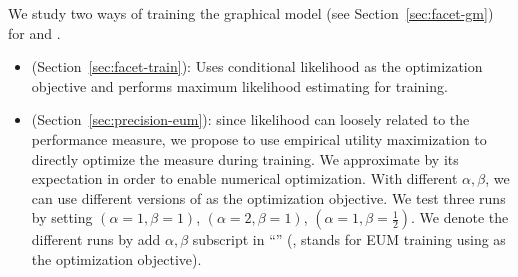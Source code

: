 
We study two ways of training the graphical model (see Section~\ref{sec:facet-gm}) for \QFI and \QFJ.
\begin{itemize}
\item \MLE (Section~\ref{sec:facet-train}): Uses conditional likelihood as the optimization objective and performs maximum likelihood estimating for training.
\item \EUM (Section~\ref{sec:precision-eum}): since likelihood can loosely related to the performance measure, we propose to use empirical utility maximization to directly optimize the \PRF measure during training. We approximate \PRF by its expectation in order to enable numerical optimization. With different $\alpha,\beta$, we can use different versions of \PRF as the optimization objective. We test three runs by setting $(\alpha\!=\!1,\beta\!=\!1)$, $(\alpha\!=\!2,\beta\!=\!1)$, $(\alpha\!=\!1,\beta\!=\!\frac{1}{2})$. 
We denote the different runs by add $\alpha,\beta$ subscript in ``\EUM'' (\eg,  stands for EUM training using  as the optimization objective).
\end{itemize}
